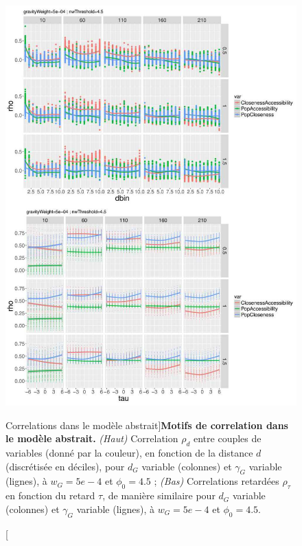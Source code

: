\begin{figure}
	\includegraphics[width=\linewidth,height=0.8\textheight]{Figures/Final/6-2-2-fig-macrocoevol-correlations.jpg}
\caption[Correlations in the abstract model][Correlations dans le modèle abstrait]{}{\textbf{Motifs de correlation dans le modèle abstrait.} \textit{(Haut)} Correlation $\rho_d$ entre couples de variables (donné par la couleur), en fonction de la distance $d$ (discrétisée en déciles), pour $d_G$ variable (colonnes) et $\gamma_G$ variable (lignes), à $w_G = 5e-4$ et $\phi_0 = 4.5$ ; \textit{(Bas)} Correlations retardées $\rho_{\tau}$ en fonction du retard $\tau$, de manière similaire pour $d_G$ variable (colonnes) et $\gamma_G$ variable (lignes), à $w_G = 5e-4$ et $\phi_0 = 4.5$. \label{fig:macrocoevol:correlations}}
\end{figure}


